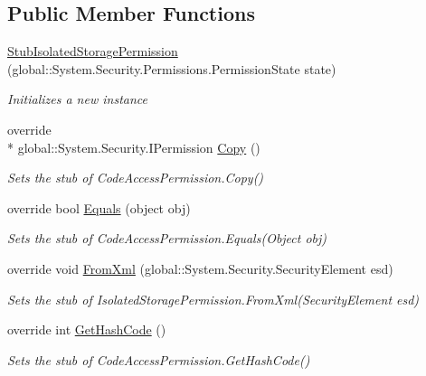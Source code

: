 \subsection*{Public Member Functions}
\begin{DoxyCompactItemize}
\item 
\hyperlink{class_system_1_1_security_1_1_permissions_1_1_fakes_1_1_stub_isolated_storage_permission_a7437ccbdd7aa1242f6548d5ded1c7e5d}{Stub\-Isolated\-Storage\-Permission} (global\-::\-System.\-Security.\-Permissions.\-Permission\-State state)
\begin{DoxyCompactList}\small\item\em Initializes a new instance\end{DoxyCompactList}\item 
override \\*
global\-::\-System.\-Security.\-I\-Permission \hyperlink{class_system_1_1_security_1_1_permissions_1_1_fakes_1_1_stub_isolated_storage_permission_af092a312237ee8f12843371606da3fd1}{Copy} ()
\begin{DoxyCompactList}\small\item\em Sets the stub of Code\-Access\-Permission.\-Copy()\end{DoxyCompactList}\item 
override bool \hyperlink{class_system_1_1_security_1_1_permissions_1_1_fakes_1_1_stub_isolated_storage_permission_a0f510d608e7d72d098c273e94696181b}{Equals} (object obj)
\begin{DoxyCompactList}\small\item\em Sets the stub of Code\-Access\-Permission.\-Equals(\-Object obj)\end{DoxyCompactList}\item 
override void \hyperlink{class_system_1_1_security_1_1_permissions_1_1_fakes_1_1_stub_isolated_storage_permission_a458aaca20be494fc7eef447e20a7a927}{From\-Xml} (global\-::\-System.\-Security.\-Security\-Element esd)
\begin{DoxyCompactList}\small\item\em Sets the stub of Isolated\-Storage\-Permission.\-From\-Xml(\-Security\-Element esd)\end{DoxyCompactList}\item 
override int \hyperlink{class_system_1_1_security_1_1_permissions_1_1_fakes_1_1_stub_isolated_storage_permission_a0e255374dd1d865544cb8e7af5669889}{Get\-Hash\-Code} ()
\begin{DoxyCompactList}\small\item\em Sets the stub of Code\-Access\-Permission.\-Get\-Hash\-Code()\end{DoxyCompactList}\item 

\end{DoxyCompactItemize}
